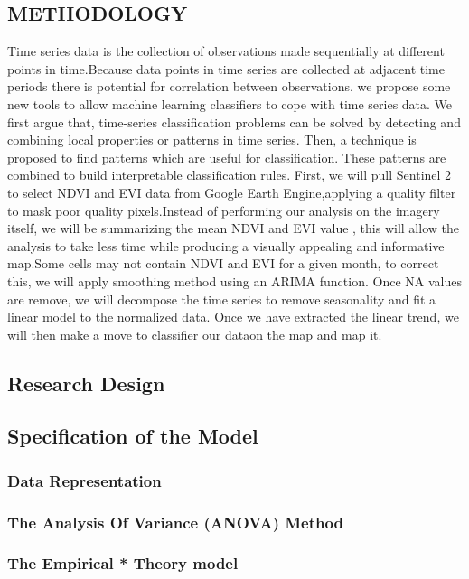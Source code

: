 \documentclass[10pt]{report}
\begin{document}
\begin{flushleft}
		\section{METHODOLOGY}
		Time series data is the collection of observations made sequentially at different points in time.Because data points in time series are collected at adjacent time periods there is potential for correlation between observations. we propose some new tools to allow machine learning classifiers to cope with time series data. We first argue that, time-series classification problems can be solved by detecting and combining local properties or patterns in time series. Then, a technique is proposed to find patterns which are useful for classification. These patterns are combined to build interpretable classification rules.
		First, we will pull Sentinel 2 to select NDVI and EVI data from Google Earth Engine,applying a quality filter to mask poor quality pixels.Instead of performing our analysis on the imagery itself, we will be summarizing the mean NDVI and EVI value , this will allow the analysis to take less time while producing a visually appealing and informative map.Some cells may not contain NDVI and EVI for a given month, to correct this, we will apply smoothing method using an ARIMA function.
		Once NA values are remove, we will decompose the time series to remove seasonality and fit a linear model to the normalized data.
		Once we have extracted the linear trend, we will then make a move to classifier our dataon the map and map it.
		
		\subsection{Research Design}
		\subsection{Specification of the Model}
		\subsubsection{Data Representation}
		\subsubsection{The Analysis Of Variance (ANOVA) Method}
		\subsubsection{The Empirical * Theory model}

\end{flushleft}
\end{document}
